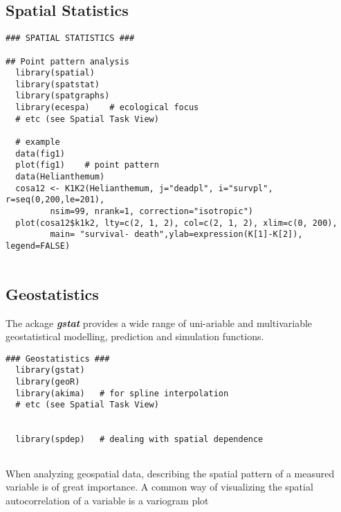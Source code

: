 \subsection{Spatial Statistics}
\begin{verbatim}
### SPATIAL STATISTICS ###
 
## Point pattern analysis
  library(spatial)
  library(spatstat)
  library(spatgraphs)
  library(ecespa)    # ecological focus
  # etc (see Spatial Task View)
 
  # example
  data(fig1)
  plot(fig1)    # point pattern
  data(Helianthemum)
  cosa12 <- K1K2(Helianthemum, j="deadpl", i="survpl", r=seq(0,200,le=201),
         nsim=99, nrank=1, correction="isotropic")
  plot(cosa12$k1k2, lty=c(2, 1, 2), col=c(2, 1, 2), xlim=c(0, 200),
         main= "survival- death",ylab=expression(K[1]-K[2]), legend=FALSE)
 
\end{verbatim}
\subsection{Geostatistics}
The ackage \textbf{\textit{gstat}} provides a wide range of uni-ariable and multivariable geostatistical modelling, prediction and simulation functions.

\begin{verbatim}
### Geostatistics ###
  library(gstat)
  library(geoR)
  library(akima)   # for spline interpolation
  # etc (see Spatial Task View)
 
 
  library(spdep)   # dealing with spatial dependence
 
 \end{verbatim}
When analyzing geospatial data, describing the spatial pattern of a measured variable is of great importance.  A common way of visualizing the spatial autocorrelation of a variable is a variogram plot
